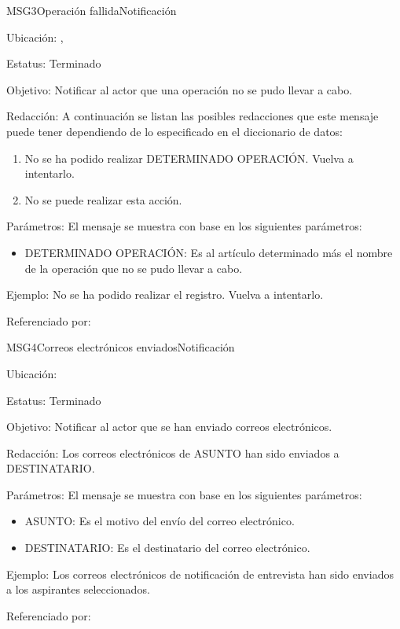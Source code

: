 \begin{mensaje}{MSG3}{Operación fallida}{Notificación}
	\item[Ubicación:] \msjSuperior, \msjEmergente
	\item[Estatus:] Terminado
	\item[Objetivo:] Notificar al actor que una operación no se pudo llevar a cabo.
	\item[Redacción:] A continuación se listan las posibles redacciones que este mensaje puede tener dependiendo de lo especificado en el diccionario de datos:
	\begin{enumerate}
		\item No se ha podido realizar DETERMINADO OPERACIÓN. Vuelva a intentarlo.
		\item No se puede realizar esta acción.
	\end{enumerate}

	\item[Parámetros:] El mensaje se muestra con base en los siguientes parámetros:
	\begin{itemize}
		\item DETERMINADO OPERACIÓN: Es al artículo determinado más el nombre de la operación que no se pudo llevar a cabo.
	\end{itemize}
	\item[Ejemplo:] No se ha podido realizar el registro. Vuelva a intentarlo.
	\item[Referenciado por:] 
\end{mensaje}


\begin{mensaje}{MSG4}{Correos electrónicos enviados}{Notificación}
	\item[Ubicación:] \msjSuperior
	\item[Estatus:] Terminado
	\item[Objetivo:] Notificar al actor que se han enviado correos electrónicos.
	\item[Redacción:] Los correos electrónicos de ASUNTO han sido enviados a DESTINATARIO.
	\item[Parámetros:] El mensaje se muestra con base en los siguientes parámetros:
		\begin{itemize}
			\item ASUNTO: Es el motivo del envío del correo electrónico.
			\item DESTINATARIO: Es el destinatario del correo electrónico.
		\end{itemize}
	\item[Ejemplo:] Los correos electrónicos de notificación de entrevista han sido enviados a los aspirantes seleccionados.
	\item[Referenciado por:] 
\end{mensaje}
